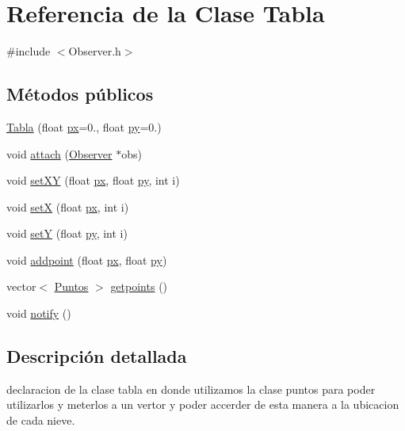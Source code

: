 \hypertarget{class_tabla}{}\section{Referencia de la Clase Tabla}
\label{class_tabla}


{\ttfamily \#include $<$Observer.\+h$>$}

\subsection*{Métodos públicos}
\begin{DoxyCompactItemize}
\item 
\mbox{\hyperlink{class_tabla_a30892e5df0e41e88871809298362bbc4}{Tabla}} (float \mbox{\hyperlink{_abstract_8cpp_a78b43084be0dc0d22055a701994a2a9e}{px}}=0., float \mbox{\hyperlink{_abstract_8cpp_a709aad4619f93afb87fab238013812b2}{py}}=0.)
\item 
void \mbox{\hyperlink{class_tabla_a3cb029beafb4bfca9c9df9a955863792}{attach}} (\mbox{\hyperlink{class_observer}{Observer}} $\ast$obs)
\item 
void \mbox{\hyperlink{class_tabla_a93caa15edb104673131a9970c8284034}{set\+XY}} (float \mbox{\hyperlink{_abstract_8cpp_a78b43084be0dc0d22055a701994a2a9e}{px}}, float \mbox{\hyperlink{_abstract_8cpp_a709aad4619f93afb87fab238013812b2}{py}}, int i)
\item 
void \mbox{\hyperlink{class_tabla_a5406268bade1eacd5e9aac2d7dfefea6}{setX}} (float \mbox{\hyperlink{_abstract_8cpp_a78b43084be0dc0d22055a701994a2a9e}{px}}, int i)
\item 
void \mbox{\hyperlink{class_tabla_a00156dd75bcd77389a6586f20e15a71c}{setY}} (float \mbox{\hyperlink{_abstract_8cpp_a709aad4619f93afb87fab238013812b2}{py}}, int i)
\item 
void \mbox{\hyperlink{class_tabla_a16815874f52762e6338c6cfa8b789663}{addpoint}} (float \mbox{\hyperlink{_abstract_8cpp_a78b43084be0dc0d22055a701994a2a9e}{px}}, float \mbox{\hyperlink{_abstract_8cpp_a709aad4619f93afb87fab238013812b2}{py}})
\item 
vector$<$ \mbox{\hyperlink{class_puntos}{Puntos}} $>$ \mbox{\hyperlink{class_tabla_adde65e47058aaa09ab20d450f713894a}{getpoints}} ()
\item 
void \mbox{\hyperlink{class_tabla_a6d72bb617a151e335756b0615269b81e}{notify}} ()
\end{DoxyCompactItemize}


\subsection{Descripción detallada}
declaracion de la clase tabla en donde utilizamos la clase puntos para poder utilizarlos y meterlos a un vertor y poder accerder de esta manera a la ubicacion de cada nieve. 


